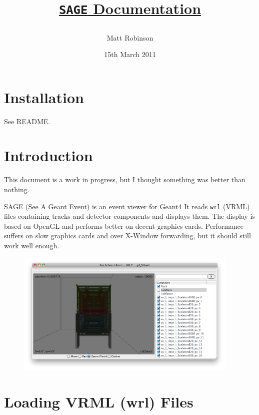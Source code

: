 \documentclass[12pt,a4]{article}
\begin{document}
\graphicspath{{figs/}}


\title{\centerline{{\underline{\texttt{SAGE} Documentation}}}}
\author{Matt Robinson}
\date{15th March 2011}
\maketitle

\section{Installation}

See README.

\section{Introduction}

This document is a work in progress, but I thought something was better than nothing.

SAGE (See A Geant Event) is an event viewer for Geant4
It reads \texttt{wrl} (VRML) files containing tracks and detector components and displays them.
The display is based on OpenGL and performs better on decent graphics cards.  Performance suffers on slow graphics cards and over X-Window forwarding, but it should still work well enough.

\begin{figure}[htb]
\includegraphics[width=0.95\textwidth]{gui.pdf}
\end{figure}

\section{Loading VRML (wrl) Files}
\end{document}
